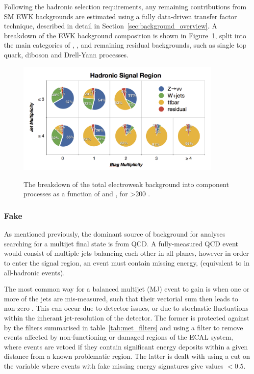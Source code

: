 Following the hadronic selection requirements,
any remaining contributions from SM EWK backgrounds are estimated using a 
fully data-driven transfer factor technique, described in detail in
Section~\ref{sec:background_overview}. A breakdown of the EWK background 
composition is shown in Figure~\ref{fig:background_decomp}, split into the main 
categories of \zinv, \wj, \ttbar and remaining residual backgrounds, such as
single top quark, diboson and Drell-Yann processes.

\begin{figure}[hb!]
\centering
\hspace{0cm}\includegraphics[width=0.9\textwidth, trim=0 00 0 0, clip=true]
{Figs/ra1_had_bg_comp_v3.png}
\label{fig:background_decomp}
\caption{The breakdown of the total electroweak background into component
processes as a function of \nj and \nb, for \HT>200 \gev.}
\end{figure}

\subsubsection{Fake \met}

As mentioned previously, the dominant source of background for analyses 
searching for a multijet final state is from QCD. A fully-measured QCD event 
would consist of multiple jets balancing each other in all planes, however in 
order to enter the signal region, an event must contain missing energy, 
\mht (equivalent to \met in all-hadronic events).

The most common way for a balanced multijet (MJ) event to gain \mht is when one 
or more of the jets are mis-measured, such that their vectorial sum then leads to non-zero
\mht. This can occur due to detector issues, or due to stochastic fluctuations
within
the inherant jet-resolution of the 
detector. The former is protected against by the \met filters summarised in 
table~\ref{tab:met_filters} and using a filter to remove events
affected by non-functioning or damaged regions of the ECAL system, where 
events are vetoed if they contain significant energy deposits within a given 
distance from a known problematic region. The latter is dealt with using a
cut on the \alphat variable where 
events with fake missing energy signatures give values $<0.5$.

